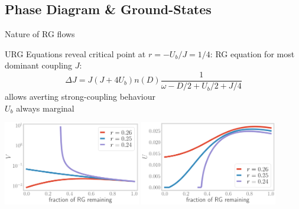 \documentclass[8pt,aspectratio=169]{beamer}
\begin{document}
\begin{frame}{}
\section{Phase Diagram \& Ground-States}
\end{frame}

\begin{frame}{Nature of RG flows}

\begin{itemize}
	\nitem URG Equations reveal \alert{critical} point at  \(r = -U_b / J = 1/4\):
	\nitem RG equation for most dominant coupling \(J\):
	\[\Delta J = J(J + 4U_b)n(D)\frac{1}{\omega - D/2 + U_b/2 + J/4}\]
\nitem allows averting strong-coupling behaviour\\[5pt]
\nitem \(U_b\) always marginal
\end{itemize}

\vspace*{\fill}

\includegraphics[width=0.45\textwidth]{V_Ub.pdf}
\hspace*{\fill}
\includegraphics[width=0.45\textwidth]{U_Ub.pdf}

\end{frame}
\end{document}
